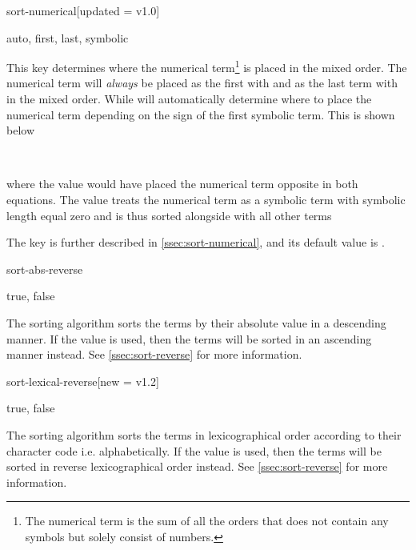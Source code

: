 	\begin{option}{sort-numerical}[updated = v1.0]
		\begin{values}[default = auto]
			auto, first, last, symbolic
		\end{values}
		This key determines where the numerical term\footnote{The numerical term is the sum of all the orders that does not contain any symbols but solely consist of numbers.\label{foot:numerical-term}} is placed in the mixed order. The numerical term will \emph{always} be placed as the first with  and as the last term with  in the mixed order. While  will automatically determine where to place the numerical term depending on the sign of the first symbolic term. This is shown below
		
		\begin{example}
			  \\
		\end{example}
		
		\noindent where the value  would have placed the numerical term opposite in both equations. The value  treats the numerical term as a symbolic term with symbolic length equal zero and is thus sorted alongside with all other terms
		\begin{example}
			\pdv[sort-numerical=symbolic, order={2+n,-a}]{f}{x,y}
		\end{example}
		The key is further described in \cref{ssec:sort-numerical}, and its default value is .
	\end{option}
	
	\begin{option}{sort-abs-reverse}
		\begin{values}[default = false]
			true, false
		\end{values}
		The sorting algorithm  sorts the terms by their absolute value in a descending manner. If the value  is used, then the terms will be sorted in an ascending manner instead. See \cref{ssec:sort-reverse} for more information.
	\end{option}
	
	\begin{option}{sort-lexical-reverse}[new = v1.2]
		\begin{values}[default = false]
			true, false
		\end{values}
		The sorting algorithm  sorts the terms in lexicographical order according to their character code i.e. alphabetically. If the value  is used, then the terms will be sorted in reverse lexicographical order instead. See \cref{ssec:sort-reverse} for more information.
	\end{option}
	
